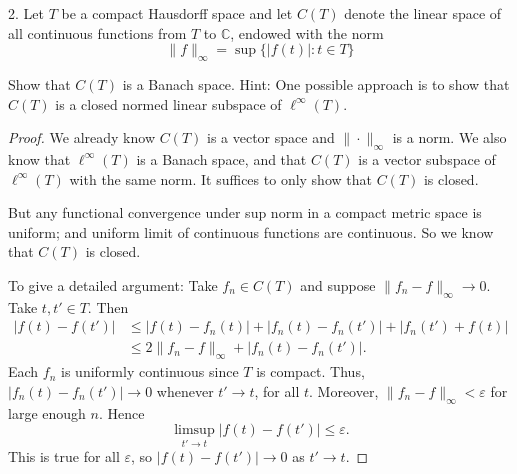 \begin{problem}
2. Let $T$ be a compact Hausdorff space and let $C(T)$ denote the linear space of all continuous functions from $T$ to $\mathbb{C}$, endowed with the norm
\[
\|f\|_{\infty}=\sup \{|f(t)|: t \in T\}
\]

Show that $C(T)$ is a Banach space.
Hint: One possible approach is to show that $C(T)$ is a closed normed linear subspace of $\ell^{\infty}(T)$.
\end{problem}
\begin{proof}
	We already know $C(T)$ is a vector space and $\|\cdot \|_\infty $ is a norm. We also know that $\ell^\infty (T)$ is a Banach space, and that $C(T)$ is a vector subspace of $\ell^\infty (T)$ with the same norm. It suffices to only show that $C(T)$ is closed.

	But any functional convergence under sup norm in a compact metric space is uniform; and uniform limit of continuous functions are continuous. So we know that $C(T)$ is closed.

	To give a detailed argument: Take $f_n \in C(T)$ and suppose $\|f_n - f\|_\infty  \to 0$. 
	Take $t, t' \in T$. Then
	\begin{align*}
		\left| f(t) - f(t') \right| &\le \left| f(t) - f_n(t) \right|  + \left| f_n(t) - f_n(t') \right| + \left| f_n(t') + f(t) \right| \\
		&\leq 2 \|f_n - f\|_\infty  + \left| f_n(t) - f_n(t') \right| 
	.\end{align*} 
	Each $f_n$ is uniformly continuous since $T$ is compact. Thus, $\left| f_n(t) - f_n(t') \right| \to 0$ whenever $t' \to  t$, for all $t$. Moreover, $\|f_n - f\|_\infty < \varepsilon$ for large enough $n$. Hence
	\[
		\limsup_{t' \to  t} \left| f(t) - f(t') \right| \le \varepsilon
	.\] 
	This is true for all $\varepsilon$, so $|f(t) - f(t')| \to 0$ as $t' \to  t$.
\end{proof}



